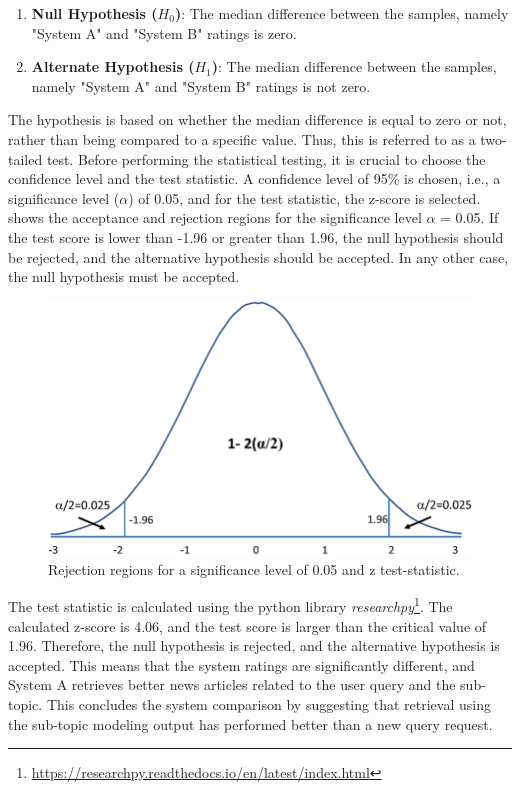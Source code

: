 \begin{enumerate}
	\item \textbf{Null Hypothesis ($H_0$)}: The median difference between the samples, namely "System A" and "System B" ratings is zero.
	
	\item \textbf{Alternate Hypothesis ($H_1$)}:  The median difference between the samples, namely "System A" and "System B" ratings is not zero.
\end{enumerate}

The hypothesis is based on whether the median difference is equal to zero or not, rather than being compared to a specific value. Thus, this is referred to as a two-tailed test. Before performing the statistical testing, it is crucial to choose the confidence level and the test statistic. A confidence level of 95\% is chosen, i.e., a significance level ($\alpha$) of 0.05, and for the test statistic, the z-score is selected.  shows the acceptance and rejection regions for the significance level $\alpha$ = 0.05. If the test score is lower than -1.96 or greater than 1.96, the null hypothesis should be rejected, and the alternative hypothesis should be accepted. In any other case, the null hypothesis must be accepted.


\begin{figure}[h]
	\centering
	\includegraphics[width=.75\textwidth]{images/outside/z_score.PNG}
	\caption[Rejection regions for z test-statistic.]{Rejection regions for a significance level of 0.05 and z test-statistic. \cite{article} \label{fig:z_score}}
\end{figure}



The test statistic is calculated using the python library \textit{researchpy}\footnote{\url{https://researchpy.readthedocs.io/en/latest/index.html}}. The calculated z-score is 4.06, and the test score is larger than the critical value of 1.96. Therefore, the null hypothesis is rejected, and the alternative hypothesis is accepted. This means that the system ratings are significantly different, and System A retrieves better news articles related to the user query and the sub-topic. This concludes the system comparison by suggesting that retrieval using the sub-topic modeling output has performed better than a new query request.

